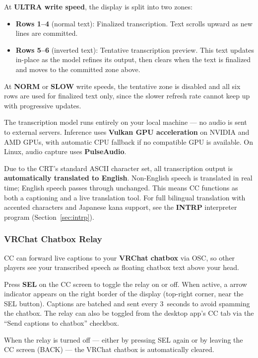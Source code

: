 \documentclass[10pt]{article}
\begin{document}
At \textbf{ULTRA write speed}, the display is split into two zones:
\begin{itemize}
  \item \textbf{Rows 1--4} (normal text): Finalized transcription. Text scrolls upward as new lines are committed.
  \item \textbf{Rows 5--6} (inverted text): Tentative transcription preview. This text updates in-place as the model refines its output, then clears when the text is finalized and moves to the committed zone above.
\end{itemize}

\noindent At \textbf{NORM} or \textbf{SLOW} write speeds, the tentative zone is disabled and all six rows are used for finalized text only, since the slower refresh rate cannot keep up with progressive updates.

The transcription model runs entirely on your local machine --- no audio is sent to external servers. Inference uses \textbf{Vulkan GPU acceleration} on NVIDIA and AMD GPUs, with automatic CPU fallback if no compatible GPU is available. On Linux, audio capture uses \textbf{PulseAudio}.

Due to the CRT's standard ASCII character set, all transcription output is \textbf{automatically translated to English}. Non-English speech is translated in real time; English speech passes through unchanged. This means CC functions as both a captioning and a live translation tool. For full bilingual translation with accented characters and Japanese kana support, see the \textbf{INTRP} interpreter program (Section~\ref{sec:intrp}).

\subsubsection{VRChat Chatbox Relay}

CC can forward live captions to your \textbf{VRChat chatbox} via OSC, so other players see your transcribed speech as floating chatbox text above your head.

Press \textbf{SEL} on the CC screen to toggle the relay on or off. When active, a \textbf{\textrightarrow} arrow indicator appears on the right border of the display (top-right corner, near the SEL button). Captions are batched and sent every 3~seconds to avoid spamming the chatbox. The relay can also be toggled from the desktop app's CC tab via the ``Send captions to chatbox'' checkbox.

When the relay is turned off --- either by pressing SEL again or by leaving the CC screen (BACK) --- the VRChat chatbox is automatically cleared.
\end{document}
